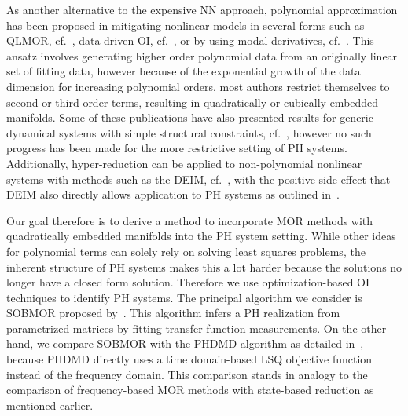 As another alternative to the expensive \ac{NN} approach, polynomial approximation has been proposed in mitigating nonlinear models in several forms such as QLMOR, cf.~\cite{Gu2011}, data-driven \ac{OI}, cf.~\cite{Peherstorfer2016, Kramer2019, BGK2020, Qian2022, Geelen2023}, or by using modal derivatives, cf.~\cite{Jain2017, Rutzmoser2017}.
This ansatz involves generating higher order polynomial data from an originally linear set of fitting data, however because of the exponential growth of the data dimension for increasing polynomial orders, most authors restrict themselves to second or third order terms, resulting in quadratically or cubically embedded manifolds.
Some of these publications have also presented results for generic dynamical systems with simple structural constraints, cf.~\cite{BGH2020, Qian2020, Gosea2021, Khodabakhshi2022}, however no such progress has been made for the more restrictive setting of \ac{PH} systems.
Additionally, hyper-reduction can be applied to non-polynomial nonlinear systems with methods such as the \ac{DEIM}, cf.~\cite{Chaturantabut2010}, with the positive side effect that \ac{DEIM} also directly allows application to \ac{PH} systems as outlined in~\cite{Chaturantabut2016}.

Our goal therefore is to derive a method to incorporate \ac{MOR} methods with quadratically embedded manifolds into the \ac{PH} system setting.
While other ideas for polynomial terms can solely rely on solving least squares problems, the inherent structure of \ac{PH} systems makes this a lot harder because the solutions no longer have a closed form solution.
Therefore we use optimization-based \ac{OI} techniques to identify \ac{PH} systems.
The principal algorithm we consider is \ac{SOBMOR} proposed by~\cite{Schwerdtner2023}.
This algorithm infers a \ac{PH} realization from parametrized matrices by fitting transfer function measurements.
On the other hand, we compare \ac{SOBMOR} with the \ac{PHDMD} algorithm as detailed in~\cite{Morandin2022}, because \ac{PHDMD} directly uses a time domain-based \ac{LSQ} objective function instead of the frequency domain.
This comparison stands in analogy to the comparison of frequency-based \ac{MOR} methods with state-based reduction as mentioned earlier.

